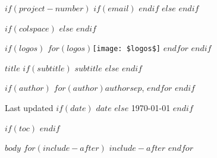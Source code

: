 \documentclass[$if(fontsize)$$fontsize$,$endif$$if(lang)$$lang$,$endif$$if(papersize)$$papersize$,$endif$$for(classoption)$$classoption$$sep$,$endfor$]{$documentclass$}
\begin{document}
$if(project-number)$
\pagestyle{fancy}
\fancyhf{}
\cfoot{\thepage}
$if(email)$
$endif$
$else$
\pagestyle{plain}
$endif$

$if(colspace)$
\setlength{\tabcolsep}{$colspace$}
$else$
\setlength{\tabcolsep}{12pt}
$endif$

$if(logos)$
$for(logos)$\texttt{[image: \$logos\$]} \hspace*{0.2cm} $endfor$
\hfill
$endif$

\Large
{\sbf $title$}\newline
$if(subtitle)$
{\sf\normalsize $subtitle$}
$else$
$endif$

\sf\normalsize{
$if(author)$
$for(author)$$author$$sep$, $endfor$\newline
$endif$
}

Last updated $if(date)$
$date$
$else$
\today
$endif$
\vspace{5mm}



$if(toc)$
\setcounter{page}{1}
\setcounter{tocdepth}{2}
\tableofcontents
$endif$


$body$
$for(include-after)$
$include-after$
$endfor$
\end{document}
